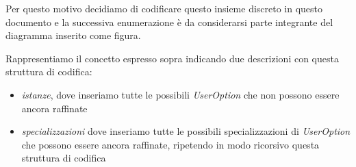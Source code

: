 Per questo motivo decidiamo di codificare questo insieme discreto in questo
documento e la successiva enumerazione \`e da considerarsi parte integrante del
diagramma inserito come figura.

Rappresentiamo il concetto espresso sopra indicando due descrizioni con questa
struttura di codifica:
\begin{itemize}
  \item \emph{istanze}, dove inseriamo tutte le possibili \emph{UserOption} che
  non possono essere ancora raffinate
  \item \emph{specializzazioni} dove inseriamo tutte le possibili
  specializzazioni di \emph{UserOption} che possono essere ancora raffinate,
  ripetendo in modo ricorsivo questa struttura di codifica
\end{itemize}

